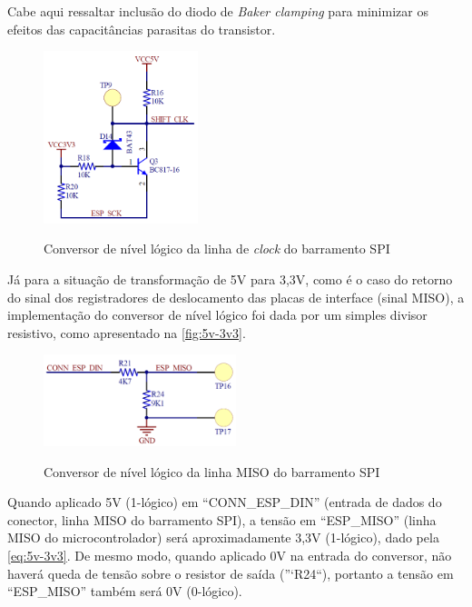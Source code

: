 Cabe aqui ressaltar inclusão do diodo de \emph{Baker clamping} para minimizar os efeitos das capacitâncias parasitas do transistor.

\begin{figure}[H]
    \centering
    \caption{Conversor de nível lógico da linha de \emph{clock} do barramento SPI}
    \includegraphics[width=0.4\textwidth]{./dados/figuras/3v3-5v}
    \label{fig:3v3-5v}
\end{figure}

Já para a situação de transformação de 5V para 3,3V, como é o caso do retorno do sinal dos registradores de deslocamento das placas de interface (sinal MISO), a implementação do conversor de nível lógico foi dada por um simples divisor resistivo, como apresentado na \autoref{fig:5v-3v3}.

\begin{figure}[H]
    \centering
    \caption{Conversor de nível lógico da linha MISO do barramento SPI}
    \includegraphics[width=0.5\textwidth]{./dados/figuras/5v-3v3}
    \label{fig:5v-3v3}
\end{figure}

Quando aplicado 5V (1-lógico) em ``CONN\_ESP\_DIN'' (entrada de dados do conector, linha MISO do barramento SPI), a tensão em ``ESP\_MISO'' (linha MISO do microcontrolador) será aproximadamente 3,3V (1-lógico), dado pela \autoref{eq:5v-3v3}. De mesmo modo, quando aplicado 0V na entrada do conversor, não haverá queda de tensão sobre o resistor de saída (''`R24``), portanto a tensão em ``ESP\_MISO'' também será 0V (0-lógico).


